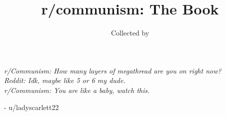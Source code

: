 \documentclass[11pt,a4paper,oneside,notitlepage]{book}
\title{r/communism: The Book}
\author{Collected by \userfmt{Mother\_Red\_Vulture}}
\date{}
\newcommand{\userfmt}[1]{u/#1}
\begin{document}
\frontmatter

\maketitle
\vfill
\newpage
\hspace{0pt}
\vfill
\begin{center}
\textit{r/Communism: How many layers of megathread are you on right now?\\
Reddit: Idk, maybe like 5 or 6 my dude.\\
r/Communism: You are like a baby, watch this.}
\end{center}
\begin{flushright}
- \userfmt{ladyscarlett22}
\end{flushright}
\vfill
\tableofcontents

\mainmatter

\end{document}

